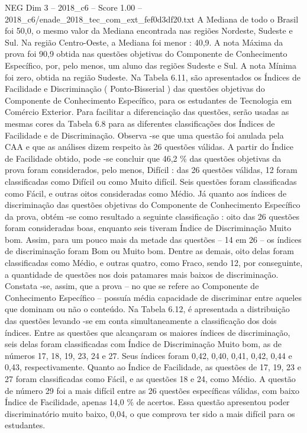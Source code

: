 \begin{textsample}{NEG Dim 3 – 2018\_c6 – Score 1.00 – 2018\_c6/enade\_2018\_tec\_com\_ext\_fef0d3df20.txt}
A Mediana de todo o Brasil foi 50,0, o mesmo valor da Mediana encontrada nas regiões Nordeste, Sudeste e Sul.
Na região Centro-Oeste, a Mediana foi menor : 40,9.
A nota Máxima da prova foi 90,9 obtida nas questões objetivas do Componente de Conhecimento Específico, por, pelo menos, um aluno das regiões Sudeste e Sul.
A nota Mínima foi zero, obtida na região Sudeste.
Na Tabela 6.11, são apresentados os Índices de Facilidade e Discriminação ( Ponto-Bisserial ) das questões objetivas do Componente de Conhecimento Específico, para os estudantes de Tecnologia em Comércio Exterior.
Para facilitar a diferenciação das questões, serão usadas as mesmas cores da Tabela 6.8 para as diferentes classificações dos Índices de Facilidade e de Discriminação.
Observa -se que uma questão foi anulada pela CAA e que as análises dizem respeito às 26 questões válidas.
A partir do Índice de Facilidade obtido, pode -se concluir que 46,2 \% das questões objetivas da prova foram considerados, pelo menos, Difícil : das 26 questões válidas, 12 foram classificadas como Difícil ou como Muito difícil.
Seis questões foram classificadas como Fácil, e outras oitos consideradas como Médio.
Já quanto aos índices de discriminação das questões objetivas do Componente de Conhecimento Específico da prova, obtém -se como resultado a seguinte classificação : oito das 26 questões foram consideradas boas, enquanto seis tiveram Índice de Discriminação Muito bom.
Assim, para um pouco mais da metade das questões – 14 em 26 – os índices de discriminação foram Bom ou Muito bom.
Dentre as demais, oito delas foram classificadas como Médio, e outras quatro, como Fraco, sendo 12, por conseguinte, a quantidade de questões nos dois patamares mais baixos de discriminação.
Constata -se, assim, que a prova – no que se refere ao Componente de Conhecimento Específico – possuía média capacidade de discriminar entre aqueles que dominam ou não o conteúdo.
Na Tabela 6.12, é apresentada a distribuição das questões levando -se em conta simultaneamente a classificação dos dois índices.
Entre as questões que alcançaram os maiores índices de discriminação, seis delas foram classificadas com Índice de Discriminação Muito bom, as de números 17, 18, 19, 23, 24 e 27.
Seus índices foram 0,42, 0,40, 0,41, 0,42, 0,44 e 0,43, respectivamente.
Quanto ao Índice de Facilidade, as questões de 17, 19, 23 e 27 foram classificadas como Fácil, e as questões 18 e 24, como Médio.
A questão de número 29 foi a mais difícil entre as 26 questões específicas válidas, com baixo Índice de Facilidade, apenas 14,0 \% de acertos.
Essa questão apresentou poder discriminatório muito baixo, 0,04, o que comprova ter sido a mais difícil para os estudantes.

\end{textsample}
